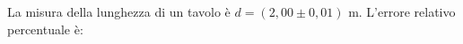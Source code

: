 La misura della lunghezza di un tavolo è 
$d = (2,00 \pm 0,01)$ m. %
L'errore relativo percentuale è: 